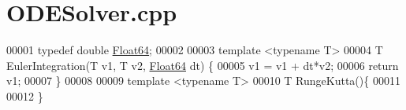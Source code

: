 \hypertarget{_o_d_e_solver_8cpp_source}{}\section{O\+D\+E\+Solver.\+cpp}
\label{_o_d_e_solver_8cpp_source}

\begin{DoxyCode}
00001 \textcolor{keyword}{typedef} \textcolor{keywordtype}{double} \hyperlink{group___tools_ga3f1431cb9f76da10f59246d1d743dc2c}{Float64};
00002 
00003 \textcolor{keyword}{template} <\textcolor{keyword}{typename} T>
00004 T EulerIntegration(T v1, T v2, \hyperlink{group___tools_ga3f1431cb9f76da10f59246d1d743dc2c}{Float64} dt) \{
00005     v1 = v1 + dt*v2;
00006     \textcolor{keywordflow}{return} v1;
00007 \}
00008 
00009 \textcolor{keyword}{template} <\textcolor{keyword}{typename} T>
00010 T RungeKutta()\{
00011 
00012 \}
\end{DoxyCode}
